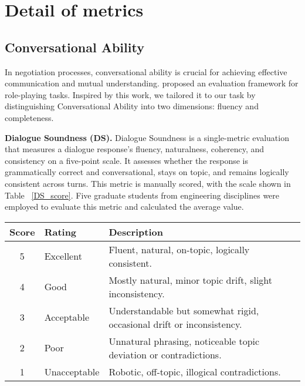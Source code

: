 \section{Detail of metrics} \label{app:metric}

\subsection{Conversational Ability} \label{app:me_conv}

In negotiation processes, conversational ability is crucial for achieving effective communication and mutual understanding. \citet{tu2024characterevalchinesebenchmarkroleplaying} proposed an evaluation framework for role-playing tasks. Inspired by this work, we tailored it to our task by distinguishing Conversational Ability into two dimensions: fluency and completeness.

\textbf{Dialogue Soundness (DS).} Dialogue Soundness is a single-metric evaluation that measures a dialogue response’s fluency, naturalness, coherency, and consistency on a five-point scale. It assesses whether the response is grammatically correct and conversational, stays on topic, and remains logically consistent across turns. This metric is manually scored, with the scale shown in Table ~\ref{DS_score}. Five graduate students from engineering disciplines were employed to evaluate this metric and calculated the average value.

\begin{table*}[h]
    \centering
    \caption{\label{DS_score}Dialogue Soundness (DS) Rating Scale}
    \begin{tabular}{c l l}
        \toprule
        \textbf{Score} & \textbf{Rating} & \textbf{Description} \\
        \midrule
        5 & Excellent  & Fluent, natural, on-topic, logically consistent. \\
        4 & Good       & Mostly natural, minor topic drift, slight inconsistency. \\
        3 & Acceptable & Understandable but somewhat rigid, occasional drift or inconsistency. \\
        2 & Poor       & Unnatural phrasing, noticeable topic deviation or contradictions. \\
        1 & Unacceptable & Robotic, off-topic, illogical contradictions. \\
        \bottomrule
    \end{tabular}
\end{table*}

